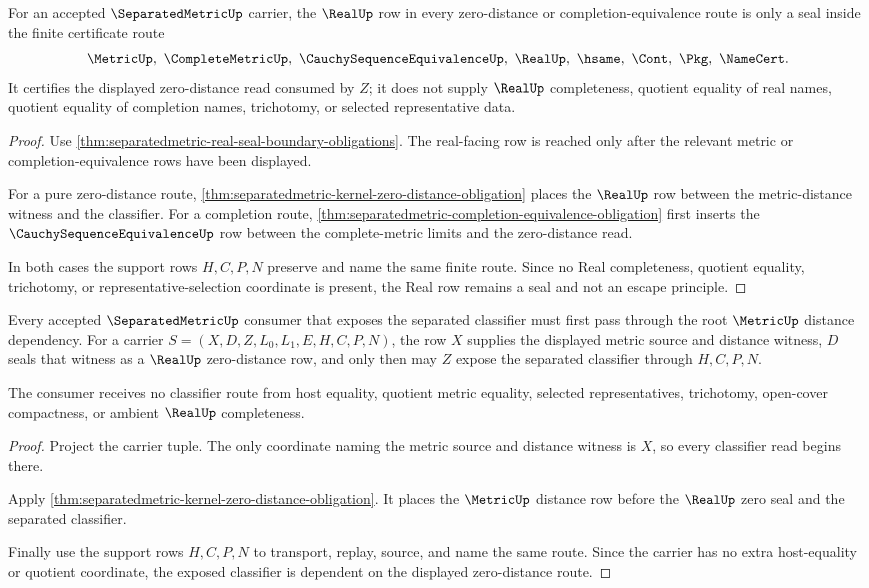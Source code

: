 \begin{theorem}
\label{thm:separatedmetric-real-seal-obligation}
For an accepted $\SeparatedMetricUp$ carrier, the $\RealUp$ row in every zero-distance or completion-equivalence route is only a seal inside the finite certificate route
$$
\MetricUp,\ \CompleteMetricUp,\ \CauchySequenceEquivalenceUp,\ \RealUp,\ \hsame,\ \Cont,\ \Pkg,\ \NameCert .
$$
It certifies the displayed zero-distance read consumed by $Z$; it does not supply $\RealUp$ completeness, quotient equality of real names, quotient equality of completion names, trichotomy, or selected representative data.
\end{theorem}
\begin{proof}
Use \autoref{thm:separatedmetric-real-seal-boundary-obligations}. The real-facing row is reached only after the relevant metric or completion-equivalence rows have been displayed.

For a pure zero-distance route, \autoref{thm:separatedmetric-kernel-zero-distance-obligation} places the $\RealUp$ row between the metric-distance witness and the classifier. For a completion route, \autoref{thm:separatedmetric-completion-equivalence-obligation} first inserts the $\CauchySequenceEquivalenceUp$ row between the complete-metric limits and the zero-distance read.

In both cases the support rows $H,C,P,N$ preserve and name the same finite route. Since no Real completeness, quotient equality, trichotomy, or representative-selection coordinate is present, the Real row remains a seal and not an escape principle.
\end{proof}

\begin{theorem}
\label{thm:separatedmetric-root-zero-distance-dependency}
Every accepted $\SeparatedMetricUp$ consumer that exposes the separated classifier must first pass through the root $\MetricUp$ distance dependency. For a carrier $S=(X,D,Z,L_0,L_1,E,H,C,P,N)$, the row $X$ supplies the displayed metric source and distance witness, $D$ seals that witness as a $\RealUp$ zero-distance row, and only then may $Z$ expose the separated classifier through $H,C,P,N$.

The consumer receives no classifier route from host equality, quotient metric equality, selected representatives, trichotomy, open-cover compactness, or ambient $\RealUp$ completeness.
\end{theorem}
\begin{proof}
Project the carrier tuple. The only coordinate naming the metric source and distance witness is $X$, so every classifier read begins there.

Apply \autoref{thm:separatedmetric-kernel-zero-distance-obligation}. It places the $\MetricUp$ distance row before the $\RealUp$ zero seal and the separated classifier.

Finally use the support rows $H,C,P,N$ to transport, replay, source, and name the same route. Since the carrier has no extra host-equality or quotient coordinate, the exposed classifier is dependent on the displayed zero-distance route.
\end{proof}

